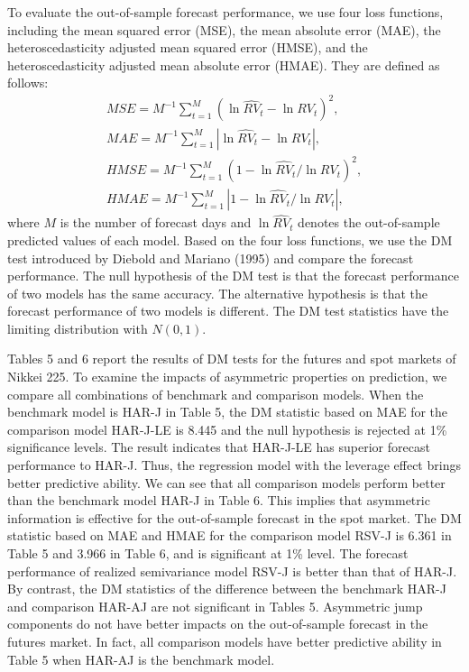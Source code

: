 \documentclass[10pt]{article}
\begin{document}
To evaluate the out-of-sample forecast performance, 
we use four loss functions, including the mean squared error (MSE), the mean absolute error (MAE), the heteroscedasticity adjusted mean squared error (HMSE), and the heteroscedasticity adjusted mean absolute error (HMAE). 
They are defined as follows:
\begin{gather}
MSE=M^{-1}\sum_{t=1}^M(\ln \hat{RV}_t- \ln RV_t)^2, \\ 
MAE=M^{-1}\sum_{t=1}^M|\ln \hat{RV}_t- \ln RV_t|, \\
HMSE=M^{-1}\sum_{t=1}^M(1-\ln \hat{RV}_t/ \ln RV_t)^2, \\ 
HMAE=M^{-1}\sum_{t=1}^M|1-\ln \hat{RV}_t/ \ln RV_t|, 
\end{gather}
where $M$ is the number of forecast days and $\ln \hat{RV}_t$ denotes the out-of-sample predicted values of each model. 
Based on the four loss functions, we use the DM test introduced by Diebold and Mariano (1995) and compare the forecast performance. 
The null hypothesis of the DM test is that the forecast performance of two models has the same accuracy. 
The alternative hypothesis is that the forecast performance of two models is different. 
The DM test statistics have the limiting distribution with $N(0,1)$. 

Tables 5 and 6 report the results of DM tests for the futures and spot markets of Nikkei 225. 
To examine the impacts of asymmetric properties on prediction, 
we compare all combinations of benchmark and comparison models.
When the benchmark model is HAR-J in Table 5, 
the DM statistic based on MAE for the comparison model HAR-J-LE is 8.445 and the null hypothesis is rejected at 1\% significance levels.
The result indicates that HAR-J-LE has superior forecast performance to HAR-J. 
Thus, the regression model with the leverage effect brings better predictive ability. 
We can see that all comparison models perform better than the benchmark model HAR-J in Table 6. 
This implies that asymmetric information is effective for the out-of-sample forecast in the spot market. 
The DM statistic based on MAE and HMAE for the comparison model RSV-J is 6.361 in Table 5 and 3.966 in Table 6, and is significant at 1\% level.
The forecast performance of realized semivariance model RSV-J is better than that of HAR-J. 
By contrast, the DM statistics of the difference between the benchmark HAR-J and comparison HAR-AJ are not significant in Tables 5. 
Asymmetric jump components do not have better impacts on the out-of-sample forecast in the futures market. 
In fact, all comparison models have better predictive ability in Table 5 when HAR-AJ is the benchmark model. 
 
\end{document}
